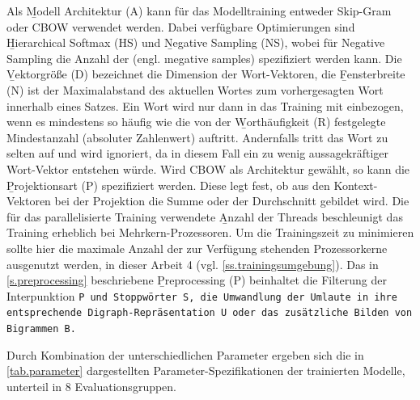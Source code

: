 Als \b{Modell Architektur (A)} kann für das Modelltraining entweder Skip-Gram oder CBOW verwendet werden. Dabei verfügbare Optimierungen sind \b{Hierarchical Softmax (HS)} und \b{Negative Sampling (NS)}, wobei für
Negative Sampling die Anzahl der  (engl. \i{negative samples}) spezifiziert werden kann. Die \b{Vektorgröße (D)} bezeichnet die Dimension der Wort-Vektoren, die \b{Fensterbreite (N)} ist der Maximalabstand des aktuellen Wortes zum vorhergesagten Wort innerhalb eines Satzes. Ein Wort wird nur dann in das Training mit einbezogen, wenn es mindestens so häufig wie die von der \b{Worthäufigkeit (R)} festgelegte Mindestanzahl (absoluter Zahlenwert) auftritt. Andernfalls tritt das Wort zu selten auf und wird ignoriert, da in diesem Fall ein zu wenig aussagekräftiger Wort-Vektor entstehen würde. Wird CBOW als Architektur gewählt, so kann die \b{Projektionsart (P)} spezifiziert werden. Diese legt fest, ob aus den Kontext-Vektoren bei der Projektion die Summe oder der Durchschnitt gebildet wird. Die für das parallelisierte Training verwendete \b{Anzahl der Threads} beschleunigt das Training erheblich bei Mehrkern-Prozessoren. Um die Trainingszeit zu minimieren sollte hier die maximale Anzahl der zur Verfügung stehenden Prozessorkerne ausgenutzt werden, in dieser Arbeit 4 (vgl. \autoref{ss.trainingsumgebung}). Das in \autoref{s.preprocessing} beschriebene \b{Preprocessing (P)} beinhaltet die Filterung der Interpunktion \tt{P} und Stoppwörter \tt{S}, die Umwandlung der Umlaute in ihre entsprechende Digraph-Repräsentation \tt{U} oder das zusätzliche Bilden von Bigrammen \tt{B}.

Durch Kombination der unterschiedlichen Parameter ergeben sich die in \autoref{tab.parameter} dargestellten Parameter-Spezifikationen der trainierten Modelle, unterteil in 8 Evaluationsgruppen.

